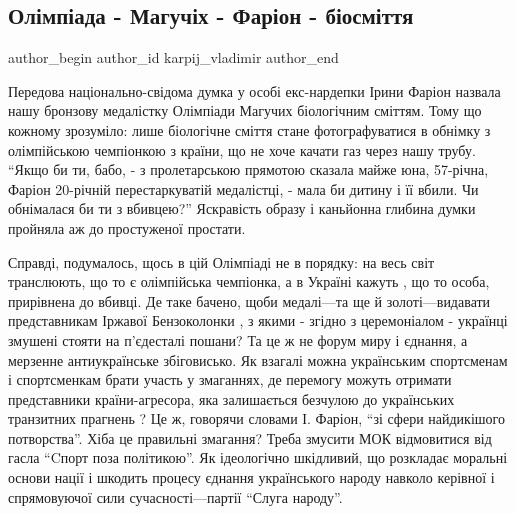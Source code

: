  
 
 
 
 
 
\subsection{Олімпіада - Магучіх - Фаріон - біосміття}
\label{sec:10_08_2021.fb.karpij_vladimir.1.maguchih_farion_olimpiada}
 
\ifcmt
 author_begin
   author_id karpij_vladimir
 author_end
\fi

Передова національно-свідома думка у особі екс-нардепки Ірини Фаріон  назвала
нашу бронзову медалістку Олімпіади Магучих біологічним сміттям. Тому що кожному
зрозуміло: лише біологічне сміття стане   фотографуватися в обнімку  з
олімпійською чемпіонкою  з країни, що  не хоче  качати газ через нашу трубу.
\enquote{Якщо би ти, бабо, - з пролетарською прямотою сказала майже юна, 57-річна,
Фаріон 20-річній  перестаркуватій медалістці, - мала  би дитину і її вбили. Чи
обнімалася би ти з вбивцею?}  Яскравість образу і  каньйонна глибина думки
пройняла аж до простуженої простати.

Справді, подумалось, щось в цій Олімпіаді не в порядку: на весь світ
транслюють, що  то є олімпійська чемпіонка, а  в Україні кажуть , що то особа,
прирівнена до вбивці.  Де  таке бачено, щоби медалі—та ще й золоті—видавати
представникам Іржавої Бензоколонки , з якими -   згідно з церемоніалом - 
українці змушені  стояти на п'єдесталі пошани?  Та це ж не форум миру і
єднання, а  мерзенне антиукраїнське збіговисько.  Як взагалі можна українським
спортсменам і спортсменкам   брати участь у змаганнях, де  перемогу  можуть
отримати  представники країни-агресора, яка залишається безчулою до
українських  транзитних прагнень ? Це ж, говорячи словами І. Фаріон, \enquote{зі сфери
найдикішого потворства}. Хіба це правильні змагання? Треба  змусити МОК
відмовитися від гасла  \enquote{Cпорт поза політикою}. Як  ідеологічно шкідливий, що
розкладає моральні основи  нації  і шкодить процесу єднання  українського
народу навколо керівної і спрямовуючої сили сучасності—партії \enquote{Слуга народу}.

